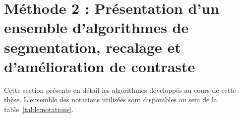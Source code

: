 \documentclass[\main/main.tex]{subfiles}
\begin{document}


\chapter{Méthode 2 : Présentation d'un ensemble d'algorithmes de segmentation, recalage et d'amélioration de contraste}

Cette section présente en détail les algorithmes développés au cours de cette thèse. L'ensemble des notations utilisées sont disponibles au sein de la table~\ref{table:notations}.










\end{document}
